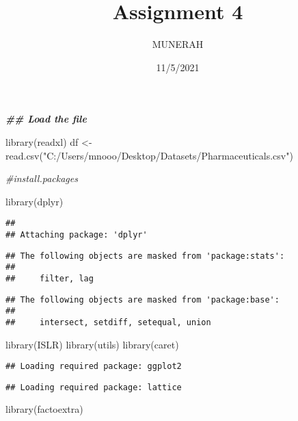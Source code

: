 \documentclass[
]{article}
\title{Assignment 4}
\author{MUNERAH}
\date{11/5/2021}
\newenvironment{Shaded}{\begin{snugshade}}{\end{snugshade}}
\newcommand{\CommentTok}[1]{\textcolor[rgb]{0.56,0.35,0.01}{\textit{#1}}}
\newcommand{\DocumentationTok}[1]{\textcolor[rgb]{0.56,0.35,0.01}{\textbf{\textit{#1}}}}
\newcommand{\FunctionTok}[1]{\textcolor[rgb]{0.00,0.00,0.00}{#1}}
\newcommand{\NormalTok}[1]{#1}
\newcommand{\OtherTok}[1]{\textcolor[rgb]{0.56,0.35,0.01}{#1}}
\newcommand{\StringTok}[1]{\textcolor[rgb]{0.31,0.60,0.02}{#1}}
\begin{document}
\maketitle

\begin{Shaded}
\begin{Highlighting}[]
\DocumentationTok{\#\# Load the file}

\FunctionTok{library}\NormalTok{(readxl)}
\NormalTok{df }\OtherTok{\textless{}{-}} \FunctionTok{read.csv}\NormalTok{(}\StringTok{"C:/Users/mnooo/Desktop/Datasets/Pharmaceuticals.csv"}\NormalTok{)}
\end{Highlighting}
\end{Shaded}

\begin{Shaded}
\begin{Highlighting}[]
\CommentTok{\#install.packages}

\FunctionTok{library}\NormalTok{(dplyr)}
\end{Highlighting}
\end{Shaded}

\begin{verbatim}
## 
## Attaching package: 'dplyr'
\end{verbatim}

\begin{verbatim}
## The following objects are masked from 'package:stats':
## 
##     filter, lag
\end{verbatim}

\begin{verbatim}
## The following objects are masked from 'package:base':
## 
##     intersect, setdiff, setequal, union
\end{verbatim}

\begin{Shaded}
\begin{Highlighting}[]
\FunctionTok{library}\NormalTok{(ISLR)}
\FunctionTok{library}\NormalTok{(utils)}
\FunctionTok{library}\NormalTok{(caret)}
\end{Highlighting}
\end{Shaded}

\begin{verbatim}
## Loading required package: ggplot2
\end{verbatim}

\begin{verbatim}
## Loading required package: lattice
\end{verbatim}

\begin{Shaded}
\begin{Highlighting}[]
\FunctionTok{library}\NormalTok{(factoextra)}
\end{Highlighting}
\end{Shaded}
\end{document}
